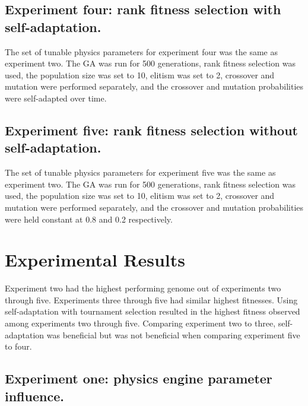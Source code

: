 \subsection[Experiment Four]{Experiment four: rank fitness selection with self-adaptation.}

The set of tunable physics parameters for experiment four was the same as experiment two. The GA was run for 500 generations, rank fitness selection was used, the population size was set to 10, elitism was set to 2, crossover and mutation were performed separately, and the crossover and mutation probabilities were self-adapted over time.

\subsection[Experiment Five]{Experiment five: rank fitness selection without self-adaptation.}

The set of tunable physics parameters for experiment five was the same as experiment two. The GA was run for 500 generations, rank fitness selection was used, the population size was set to 10, elitism was set to 2, crossover and mutation were performed separately, and the crossover and mutation probabilities were held constant at 0.8 and 0.2 respectively.

\section{Experimental Results}

Experiment two had the highest performing genome out of experiments two through five. Experiments three through five had similar highest fitnesses. Using self-adaptation with tournament selection resulted in the highest fitness observed among experiments two through five. Comparing experiment two to three, self-adaptation was beneficial but was not beneficial when comparing experiment five to four.   

\subsection[Experiment One]{Experiment one: physics engine parameter influence.}

